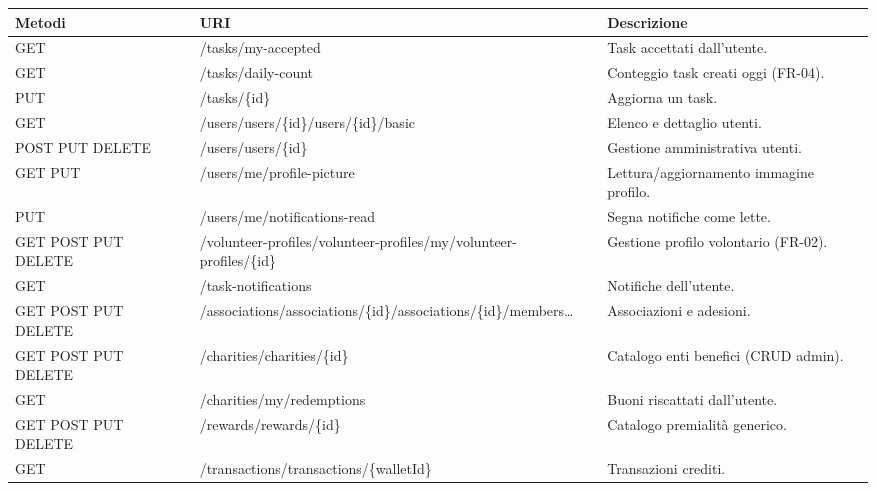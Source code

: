 \documentclass[11pt,a4paper]{article}
\begin{document}
{\scriptsize
\begin{xltabular}{\linewidth}{|>{\raggedright\arraybackslash}p{2.7cm}|>{\ttfamily\raggedright\arraybackslash}p{5.0cm}|Y|}
\hline
{}\color{white}\bfseries Metodi & \color{white}\bfseries URI & \color{white}\bfseries Descrizione\\\hline
\endhead
GET & /tasks/my-accepted & \normalfont Task accettati dall'utente.\\\hline
GET & /tasks/daily-count & \normalfont Conteggio task creati oggi (FR-04).\\\hline
PUT & /tasks/\{id\} & \normalfont Aggiorna un task.\\\hline
GET & /users\newline /users/\{id\}\newline /users/\{id\}/basic & \normalfont Elenco e dettaglio utenti.\\\hline
POST PUT DELETE & /users\newline /users/\{id\} & \normalfont Gestione amministrativa utenti.\\\hline
GET PUT & /users/me/profile-picture & \normalfont Lettura/aggiornamento immagine profilo.\\\hline
PUT & /users/me/notifications-read & \normalfont Segna notifiche come lette.\\\hline
GET POST PUT DELETE & /volunteer-profiles\newline /volunteer-profiles/my\newline /volunteer-profiles/\{id\} & \normalfont Gestione profilo volontario (FR-02).\\\hline
GET & /task-notifications & \normalfont Notifiche dell'utente.\\\hline
GET POST PUT DELETE & /associations\newline /associations/\{id\}\newline /associations/\{id\}/members\ldots & \normalfont Associazioni e adesioni.\\\hline
GET POST PUT DELETE & /charities\newline /charities/\{id\} & \normalfont Catalogo enti benefici (CRUD admin).\\\hline
GET & /charities/my/redemptions & \normalfont Buoni riscattati dall'utente.\\\hline
GET POST PUT DELETE & /rewards\newline /rewards/\{id\} & \normalfont Catalogo premialit\`a generico.\\\hline
GET & /transactions\newline /transactions/\{walletId\} & \normalfont Transazioni crediti.\\\hline

\end{xltabular}}
\end{document}
